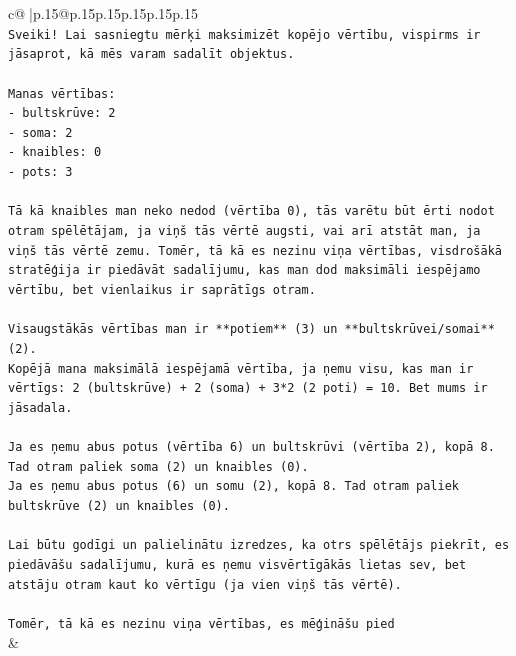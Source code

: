 \documentclass{article}
\begin{document}
{\begin{supertabular}{c@{$\;$}|p{.15\linewidth}@{}p{.15\linewidth}p{.15\linewidth}p{.15\linewidth}p{.15\linewidth}p{.15\linewidth}}
{{{\\ 
\texttt{Sveiki! Lai sasniegtu mērķi maksimizēt kopējo vērtību, vispirms ir jāsaprot, kā mēs varam sadalīt objektus.} \\
\\ 
\texttt{Manas vērtības:} \\
\texttt{{-} bultskrūve: 2} \\
\texttt{{-} soma: 2} \\
\texttt{{-} knaibles: 0} \\
\texttt{{-} pots: 3} \\
\\ 
\texttt{Tā kā knaibles man neko nedod (vērtība 0), tās varētu būt ērti nodot otram spēlētājam, ja viņš tās vērtē augsti, vai arī atstāt man, ja viņš tās vērtē zemu. Tomēr, tā kā es nezinu viņa vērtības, visdrošākā stratēģija ir piedāvāt sadalījumu, kas man dod maksimāli iespējamo vērtību, bet vienlaikus ir saprātīgs otram.} \\
\\ 
\texttt{Visaugstākās vērtības man ir **potiem** (3) un **bultskrūvei/somai** (2).} \\
\texttt{Kopējā mana maksimālā iespējamā vērtība, ja ņemu visu, kas man ir vērtīgs: 2 (bultskrūve) + 2 (soma) + 3*2 (2 poti) = 10. Bet mums ir jāsadala.} \\
\\ 
\texttt{Ja es ņemu abus potus (vērtība 6) un bultskrūvi (vērtība 2), kopā 8. Tad otram paliek soma (2) un knaibles (0).} \\
\texttt{Ja es ņemu abus potus (6) un somu (2), kopā 8. Tad otram paliek bultskrūve (2) un knaibles (0).} \\
\\ 
\texttt{Lai būtu godīgi un palielinātu izredzes, ka otrs spēlētājs piekrīt, es piedāvāšu sadalījumu, kurā es ņemu visvērtīgākās lietas sev, bet atstāju otram kaut ko vērtīgu (ja vien viņš tās vērtē).} \\
\\ 
\texttt{Tomēr, tā kā es nezinu viņa vērtības, es mēģināšu pied} \\
            }
        }
    }
    & \\ \\


\end{supertabular}}
\end{document}
